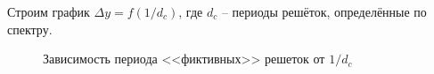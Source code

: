 \documentclass[a5paper,10pt, twoside]{article} %
\begin{document}
	\newpage

	Строим график $\Delta y = f(1 / d_c)$, где $d_c$ -- периоды решёток, определённые по спектру.

	\begin{figure}[h]\label{gr:2}
		\caption{Зависимость периода <<фиктивных>> решеток от $1/d_c$}
	\end{figure}
\end{document}
